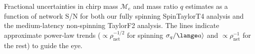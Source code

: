 \label{fig:Mc_q_std_snr} Fractional uncertainties in chirp mass $\mathcal{M}_\mathrm{c}$ and mass ratio $q$ estimates as a function of network S/N for both our fully spinning SpinTaylorT4 analysis and the medium-latency non-spinning TaylorF2 analysis. The lines indicate approximate power-law trends ($\propto \rho_\mathrm{net}^{-1/2}$ for spinning $\sigma_q/\lange a\rangle$ and $\propto \rho_\mathrm{net}^{-1}$ for the rest) to guide the eye.
  
  
  
  
  